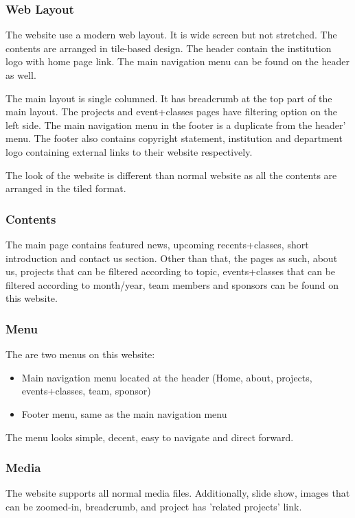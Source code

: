 \subsubsection*{Web Layout}
The website use a modern web layout. It is wide screen but not stretched. The contents are arranged in tile-based design. The header contain the institution logo with home page link. The main navigation menu can be found on the header as well.

The main layout is single columned. It has breadcrumb at the top part of the main layout. The projects and event+classes pages have filtering option on the left side. The main navigation menu in the footer is a duplicate from the header' menu. The footer also contains copyright statement, institution and department logo containing external links to their website respectively.

The look of the website is different than normal website as all the contents are arranged in the tiled format.

\subsubsection*{Contents}
The main page contains featured news, upcoming recents+classes, short introduction and contact us section. Other than that, the pages as such, about us, projects that can be filtered according to topic, events+classes that can be filtered according to month/year, team members and sponsors can be found on this website.

\subsubsection*{Menu}
The are two menus on this website:
\begin{itemize}
\item Main navigation menu located at the header (Home, about, projects, events+classes, team, sponsor)
\item Footer menu, same as the main navigation menu
\end{itemize}

The menu looks simple, decent, easy to navigate and direct forward.

\subsubsection*{Media}
The website supports all normal media files. Additionally, slide show, images that can be zoomed-in, breadcrumb, and project has 'related projects' link.

